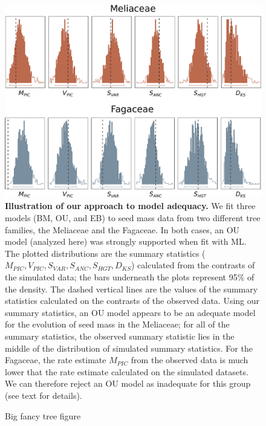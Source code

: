\documentclass[a4paper,12pt]{article}
\begin{document}
\begin{figure}[p]
  \centering
  \includegraphics[scale=0.5]{figs/two-clade-example}
  \caption{\textbf{Illustration of our approach to model adequacy.} We fit three models (BM, OU, and EB) to seed mass data from two different tree families, the Meliaceae and the Fagaceae. In both cases, an OU model (analyzed here) was strongly supported when fit with ML. The plotted distributions are the summary statistics ($M_{PIC}, V_{PIC}, S_{VAR}, S_{ANC}, S_{HGT}, D_{KS}$) calculated from the contrasts of the simulated data; the bars underneath the plots represent 95\% of the density. The dashed vertical lines are the values of the summary statistics calculated on the contrasts of the observed data. Using our summary statistics, an OU model appears to be an adequate model for the evolution of seed mass in the Meliaceae; for all of the summary statistics, the observed summary statistic lies in the middle of the distribution of simulated summary statistics. For the Fagaceae, the rate estimate $M_{PIC}$ from the observed data is much lower that the rate estimate calculated on the simulated datasets. We can therefore reject an OU model as inadequate for this group (see text for details).}
  \label{fig:two-clades}
\end{figure}

\begin{figure}[p]
  \centering
  \caption{Big fancy tree figure}
  \label{fig:angio-phylogeny}
\end{figure}
\end{document}
